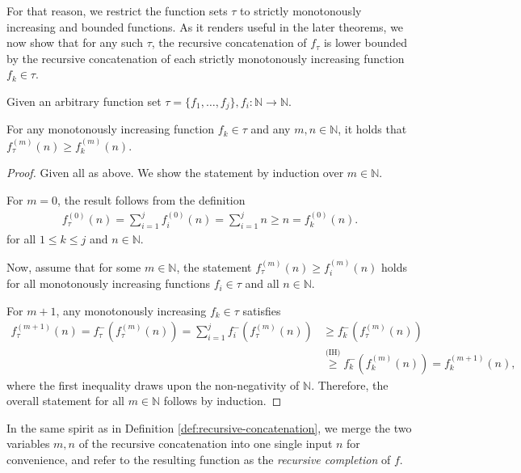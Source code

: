 For that reason, we restrict the function sets $\tau$ to strictly monotonously increasing and bounded functions.
As it renders useful in the later theorems, we now show that for any such $\tau$, the recursive concatenation of $f_{\tau}$ is lower bounded by the recursive concatenation of each strictly monotonously increasing function $f_k\in\tau$.

\begin{lemma}
	\label{lemma:max-bound-recursive-concatenation-sum}
	Given an arbitrary function set $\tau=\{f_1,\dots,f_j\},f_i:\mathbb{N}\to\mathbb{N}$.
	
	For any monotonously increasing function $f_k\in\tau$ and any $m,n\in\mathbb{N}$, it holds that
	$f_{\tau}^{(m)}(n)\geq f_k^{(m)}(n)$.
\end{lemma}
\begin{proof}
	Given all as above.
	We show the statement by induction over $m\in\mathbb{N}$.
	
	For $m=0$, the result follows from the definition
	\begin{align*}
		f_{\tau}^{(0)}(n)=\sum_{i=1}^{j} f_{i}^{(0)}(n)=\sum_{i=1}^{j}n\geq n=f_{k}^{(0)}(n).
	\end{align*}
	for all $1\leq k\leq j$ and $n\in\mathbb{N}$.
	
	Now, assume that for some $m\in\mathbb{N}$, the statement $f_{\tau}^{(m)}(n)\geq f_i^{(m)}(n)$ holds for all monotonously increasing functions $f_i\in\tau$ and all $n\in\mathbb{N}$.
	
	For $m+1$, any monotonously increasing $f_k \in \tau$ satisfies
	\begin{align}
		\label{eq:lemma:max-bound-recursive-concatenation-sum-inequality}
		f_{\tau}^{(m+1)}(n) = f_{\tau}^{-}(f_{\tau}^{(m)}(n)) = \sum_{i=1}^{j}f_i^{-}(f_{\tau}^{(m)}(n))
		&\geq f_k^{-}(f_{\tau}^{(m)}(n))\\
		&\overset{\text{(IH)}}{\geq} f_k^{-}( f_k^{(m)}(n)) = f_k^{(m+1)}(n),
	\end{align}
	where the first inequality draws upon the non-negativity of $\mathbb{N}$.
	Therefore, the overall statement for all $m\in\mathbb{N}$ follows by induction.	
	
\end{proof}

In the same spirit as in Definition \ref{def:recursive-concatenation}, we merge the two variables $m,n$ of the recursive concatenation into one single input $n$ for convenience, and refer to the resulting function as the \textit{recursive completion} of $f$.

